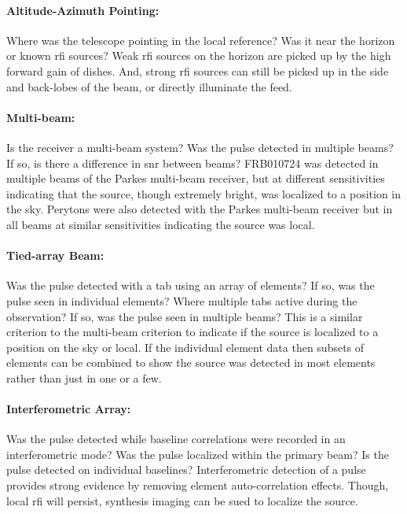 \documentclass[a4paper,fleqn,usenatbib]{mnras}
\begin{document}
\paragraph{Altitude-Azimuth Pointing:}

Where was the telescope pointing in the local reference? Was it near the horizon
or known \gls{rfi} sources? Weak \gls{rfi} sources on the horizon are picked up
by the high forward gain of dishes. And, strong \gls{rfi} sources can still be
picked up in the side and back-lobes of the beam, or directly illuminate the
feed.

\paragraph{Multi-beam:}

Is the receiver a multi-beam system? Was the pulse detected in multiple beams?
If so, is there a difference in \gls{snr} between beams? FRB010724 was detected
in multiple beams of the Parkes multi-beam receiver, but at different
sensitivities indicating that the source, though extremely bright, was localized
to a position in the sky. Perytons were also detected with the Parkes multi-beam
receiver but in all beams at similar sensitivities indicating the source was
local.

\paragraph{Tied-array Beam:}

Was the pulse detected with a \gls{tab} using an array of elements? If so, was
the pulse seen in individual elements? Where multiple \glspl{tab} active during
the observation? If so, was the pulse seen in multiple beams? This is a similar
criterion to the multi-beam criterion to indicate if the source is localized to
a position on the sky or local. If the individual element data then subsets of
elements can be combined to show the source was detected in most elements rather
than just in one or a few.

\paragraph{Interferometric Array:}

Was the pulse detected while baseline correlations were recorded in an
interferometric mode? Was the pulse localized within the primary beam? Is the
pulse detected on individual baselines? Interferometric detection of a pulse
provides strong evidence by removing element auto-correlation effects. Though,
local \gls{rfi} will persist, synthesis imaging can be sued to localize the
source.
\end{document}
